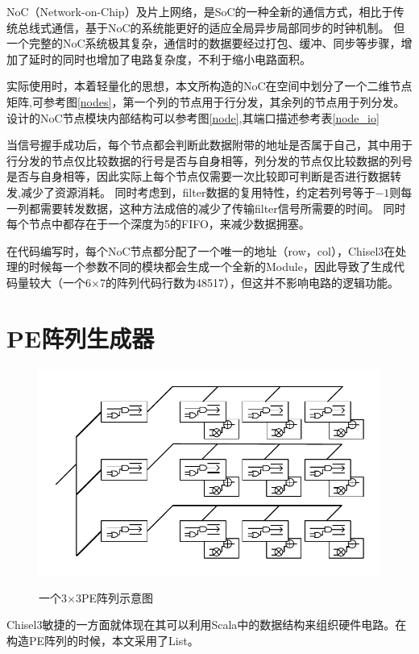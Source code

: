 NoC（Network-on-Chip）及片上网络，是SoC的一种全新的通信方式，相比于传统总线式通信，基于NoC的系统能更好的适应全局异步局部同步的时钟机制。
但一个完整的NoC系统极其复杂，通信时的数据要经过打包、缓冲、同步等步骤，增加了延时的同时也增加了电路复杂度，不利于缩小电路面积。

实际使用时，本着轻量化的思想，本文所构造的NoC在空间中划分了一个二维节点矩阵,可参考图\ref{nodes}，第一个列的节点用于行分发，其余列的节点用于列分发。设计的NoC节点模块内部结构可以参考图\ref{node},其端口描述参考表\ref{node_io}

当信号握手成功后，每个节点都会判断此数据附带的地址是否属于自己，其中用于行分发的节点仅比较数据的行号是否与自身相等，列分发的节点仅比较数据的列号是否与自身相等，因此实际上每个节点仅需要一次比较即可判断是否进行数据转发,减少了资源消耗。
同时考虑到，filter数据的复用特性，约定若列号等于$-1$则每一列都需要转发数据，这种方法成倍的减少了传输filter信号所需要的时间。
同时每个节点中都存在于一个深度为5的FIFO，来减少数据拥塞。

在代码编写时，每个NoC节点都分配了一个唯一的地址（row，col），Chisel3在处理的时候每一个参数不同的模块都会生成一个全新的Module，因此导致了生成代码量较大（一个6×7的阵列代码行数为48517），但这并不影响电路的逻辑功能。

\section{PE阵列生成器}
\begin{figure}[h]
    \centering
    \includegraphics{../pdf/PEArray.pdf}\\
    \caption{一个3×3PE阵列示意图}
\end{figure}
Chisel3敏捷的一方面就体现在其可以利用Scala中的数据结构来组织硬件电路。在构造PE阵列的时候，本文采用了List。
